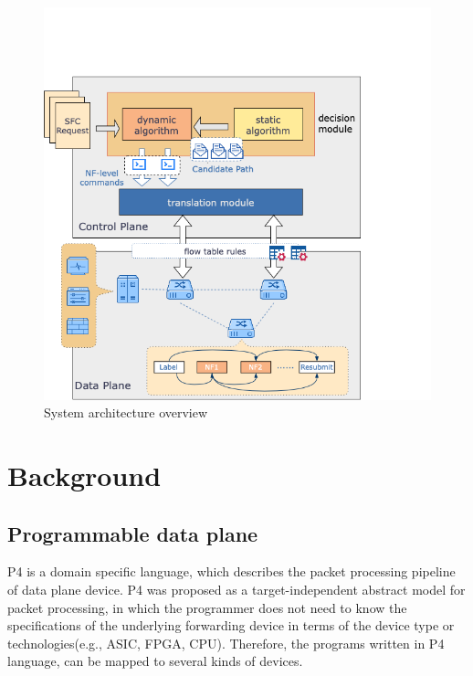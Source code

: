 \documentclass[10pt, conference, letterpaper]{IEEEtran}
\begin{document}
%
%
%



\begin{figure}[t]
\centerline{\includegraphics[scale=0.4]{src/arch.png}}
\caption{System architecture overview}
\label{architecture}
\end{figure}
 
\section{Background}

\subsection{Programmable data plane}
P4\cite{bosshart2014p4} is a domain specific language, which describes the packet processing pipeline of data plane device.  P4 was proposed as a target-independent abstract model for packet processing, in which the programmer does not need to know the specifications of the underlying forwarding device in terms of the device type or technologies(e.g., ASIC, FPGA, CPU). Therefore, the programs written in P4 language, can be mapped to several kinds of devices. 
\end{document}
